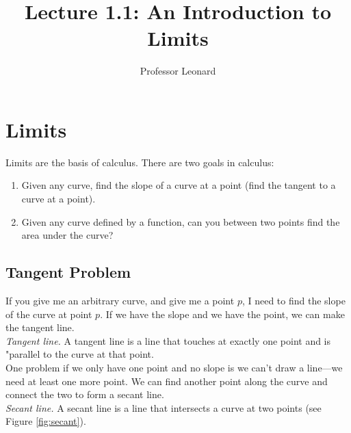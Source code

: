 \documentclass{article}
\begin{document}
\title{Lecture 1.1: An Introduction to Limits}
\author{Professor Leonard}
\maketitle

\section{Limits}

Limits are the basis of calculus. There are two goals in calculus:

\begin{enumerate}
    \item Given any curve, find the slope of a curve at a point (find the tangent to a
        curve at a point).
    \item Given any curve defined by a function, can you between two points find the area
        under the curve?
\end{enumerate}

\subsection{Tangent Problem}

If you give me an arbitrary curve, and give me a point $p$, I need to find the slope of
the curve at point $p$. If we have the slope and we have the point, we can make the
tangent line. \\

\emph{Tangent line.} A tangent line is a line that touches at exactly one point and is
"parallel to the curve at that point.\\

One problem if we only have one point and no slope is we can't draw a line---we need at
least one more point. We can find another point along the curve and connect the two to
form a secant line.\\

\emph{Secant line.} A secant line is a line that intersects a curve at two points (see
Figure \ref{fig:secant}).\\
\end{document}
